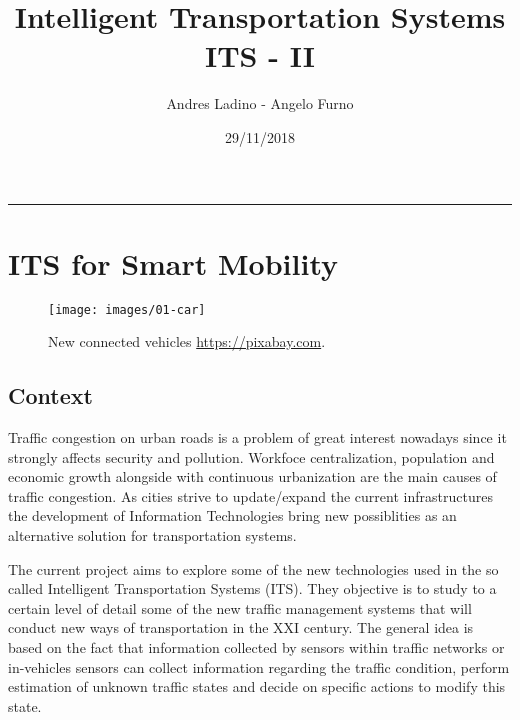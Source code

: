 \documentclass[]{book}
\title{Intelligent Transportation Systems ITS - II}
\author{Andres Ladino - Angelo Furno}
\date{29/11/2018}
\theoremstyle{definition}
\theoremstyle{definition}
\theoremstyle{definition}
\theoremstyle{remark}
\begin{document}
\maketitle

{
\hypersetup{linkcolor=black}
\setcounter{tocdepth}{1}
\tableofcontents
}
\begin{center}\rule{0.5\linewidth}{\linethickness}\end{center}

\hypertarget{its-for-smart-mobility}{%
\chapter*{ITS for Smart Mobility}\label{its-for-smart-mobility}}




\begin{figure}

{\centering \texttt{[image: images/01-car]} 

}

\caption{New connected vehicles
\href{Taken\%20from:\%20https://pixabay.com}{https://pixabay.com}.}\label{fig:car}
\end{figure}

\hypertarget{context}{%
\section*{Context}\label{context}}

Traffic congestion on urban roads is a problem of great interest
nowadays since it strongly affects security and pollution. Workfoce
centralization, population and economic growth alongside with continuous
urbanization are the main causes of traffic congestion. As cities strive
to update/expand the current infrastructures the development of
Information Technologies bring new possiblities as an alternative
solution for transportation systems.

The current project aims to explore some of the new technologies used in
the so called Intelligent Transportation Systems (ITS). They objective
is to study to a certain level of detail some of the new traffic
management systems that will conduct new ways of transportation in the
XXI century. The general idea is based on the fact that information
collected by sensors within traffic networks or in-vehicles sensors can
collect information regarding the traffic condition, perform estimation
of unknown traffic states and decide on specific actions to modify this
state.
\end{document}
